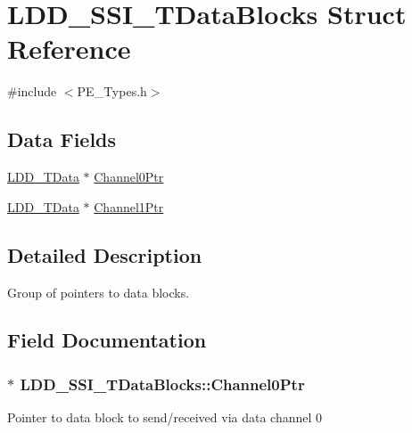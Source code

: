 \hypertarget{struct_l_d_d___s_s_i___t_data_blocks}{}\section{L\+D\+D\+\_\+\+S\+S\+I\+\_\+\+T\+Data\+Blocks Struct Reference}
\label{struct_l_d_d___s_s_i___t_data_blocks}


{\ttfamily \#include $<$P\+E\+\_\+\+Types.\+h$>$}

\subsection*{Data Fields}
\begin{DoxyCompactItemize}
\item 
\hyperlink{group___p_e___types__module_gade8ef9401405bd941b6da738b807f980}{L\+D\+D\+\_\+\+T\+Data} $\ast$ \hyperlink{struct_l_d_d___s_s_i___t_data_blocks_a8b1b9f1fd6075f9d9975f1506ac64a16}{Channel0\+Ptr}
\item 
\hyperlink{group___p_e___types__module_gade8ef9401405bd941b6da738b807f980}{L\+D\+D\+\_\+\+T\+Data} $\ast$ \hyperlink{struct_l_d_d___s_s_i___t_data_blocks_a5c0e65fe82f88a245123217769316fef}{Channel1\+Ptr}
\end{DoxyCompactItemize}


\subsection{Detailed Description}
Group of pointers to data blocks. 

\subsection{Field Documentation}
\hypertarget{struct_l_d_d___s_s_i___t_data_blocks_a8b1b9f1fd6075f9d9975f1506ac64a16}{}
\subsubsection[{Channel0\+Ptr}]{$\ast$ L\+D\+D\+\_\+\+S\+S\+I\+\_\+\+T\+Data\+Blocks\+::\+Channel0\+Ptr}\label{struct_l_d_d___s_s_i___t_data_blocks_a8b1b9f1fd6075f9d9975f1506ac64a16}
Pointer to data block to send/received via data channel 0 \hypertarget{struct_l_d_d___s_s_i___t_data_blocks_a5c0e65fe82f88a245123217769316fef}{}
